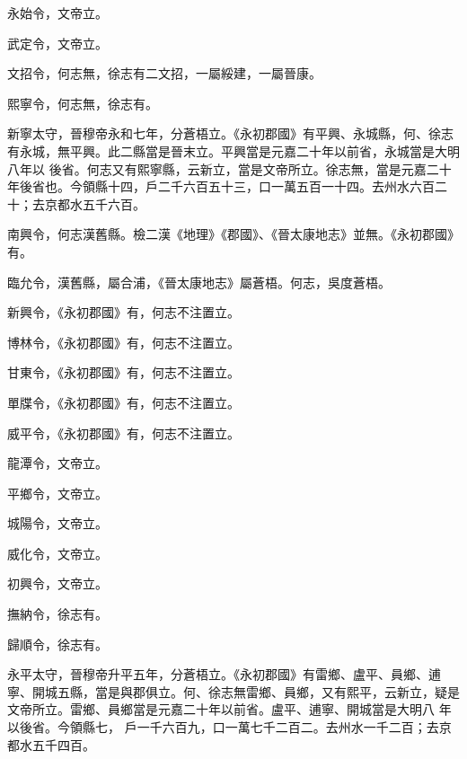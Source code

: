 \begin{pinyinscope}
 永始令，文帝立。



 武定令，文帝立。



 文招令，何志無，徐志有二文招，一屬綏建，一屬晉康。



 熙寧令，何志無，徐志有。



 新寧太守，晉穆帝永和七年，分蒼梧立。《永初郡國》有平興、永城縣，何、徐志有永城，無平興。此二縣當是晉末立。平興當是元嘉二十年以前省，永城當是大明八年以
 後省。何志又有熙寧縣，云新立，當是文帝所立。徐志無，當是元嘉二十年後省也。今領縣十四，戶二千六百五十三，口一萬五百一十四。去州水六百二十；去京都水五千六百。



 南興令，何志漢舊縣。檢二漢《地理》《郡國》、《晉太康地志》並無。《永初郡國》有。



 臨允令，漢舊縣，屬合浦，《晉太康地志》屬蒼梧。何志，吳度蒼梧。



 新興令，《永初郡國》有，何志不注置立。



 博林令，《永初郡國》有，何志不注置立。



 甘東令，《永初郡國》有，何志不注置立。



 單牒令，《永初郡國》有，何志不注置立。



 威平令，《永初郡國》有，何志不注置立。



 龍潭令，文帝立。



 平鄉令，文帝立。



 城陽令，文帝立。



 威化令，文帝立。



 初興令，文帝立。



 撫納令，徐志有。



 歸順令，徐志有。


永平太守，晉穆帝升平五年，分蒼梧立。《永初郡國》有雷鄉、盧平、員鄉、逋寧、開城五縣，當是與郡俱立。何、徐志無雷鄉、員鄉，又有熙平，云新立，疑是文帝所立。雷鄉、員鄉當是元嘉二十年以前省。盧平、逋寧、開城當是大明八
 年以後省。今領縣七，
 戶一千六百九，口一萬七千二百二。去州水一千二百；去京都水五千四百。




\end{pinyinscope}
